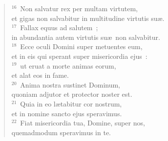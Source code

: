 \begin{verse}
${}^{16}$~Non salvatur rex per multam virtutem,\\ et gigas non salvabitur in multitudine virtutis su\ae .\\
${}^{17}$~Fallax equus ad salutem~;\\ in abundantia autem virtutis su\ae\ non salvabitur.\\
${}^{18}$~Ecce oculi Domini super metuentes eum,\\ et in eis qui sperant super misericordia ejus~:\\
${}^{19}$~ut eruat a morte animas eorum,\\ et alat eos in fame.\\
${}^{20}$~Anima nostra sustinet Dominum,\\ quoniam adjutor et protector noster est.\\
${}^{21}$~Quia in eo l\ae tabitur cor nostrum,\\ et in nomine sancto ejus speravimus.\\
${}^{22}$~Fiat misericordia tua, Domine, super nos,\\ quemadmodum speravimus in te.\end{verse}




